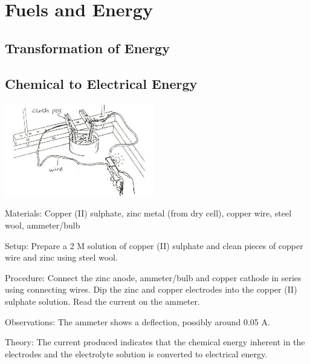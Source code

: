 \section{Fuels and Energy}

\begin{multicols}{2}


\section*{Transformation of Energy} 


\subsection{Chemical to Electrical Energy}   %

\begin{center}
\includegraphics[width=0.49\textwidth]{./img/source/chem-energy.jpg}
\end{center}

\begin{description*}
\item[Materials:]{Copper (II) sulphate, zinc metal (from dry cell), copper wire, steel wool, ammeter/bulb}
\item[Setup:]{Prepare a 2 M solution of copper (II) sulphate and clean pieces of copper wire and zinc using steel wool.}
\item[Procedure:]{Connect the zinc anode, ammeter/bulb and copper cathode in series using connecting wires. Dip the zinc and copper electrodes into the copper (II) sulphate solution. Read the current on the ammeter.}
\item[Observations:]{The ammeter shows a deflection, possibly around 0.05 A.}
\item[Theory:]{The current produced indicates that the chemical energy inherent in the electrodes and the electrolyte solution is converted to electrical energy.}
\end{description*}


\end{multicols}
